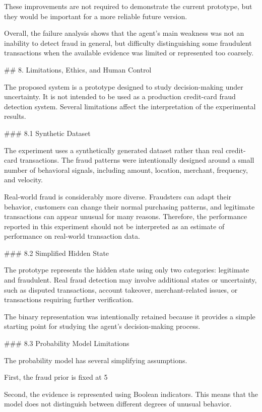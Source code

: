 These improvements are not required to demonstrate the current prototype, but they would be important for a more reliable future version.

Overall, the failure analysis shows that the agent's main weakness was not an inability to detect fraud in general, but difficulty distinguishing some fraudulent transactions when the available evidence was limited or represented too coarsely.

## 8. Limitations, Ethics, and Human Control

The proposed system is a prototype designed to study decision-making under uncertainty. It is not intended to be used as a production credit-card fraud detection system. Several limitations affect the interpretation of the experimental results.

### 8.1 Synthetic Dataset

The experiment uses a synthetically generated dataset rather than real credit-card transactions. The fraud patterns were intentionally designed around a small number of behavioral signals, including amount, location, merchant, frequency, and velocity.

Real-world fraud is considerably more diverse. Fraudsters can adapt their behavior, customers can change their normal purchasing patterns, and legitimate transactions can appear unusual for many reasons. Therefore, the performance reported in this experiment should not be interpreted as an estimate of performance on real-world transaction data.

### 8.2 Simplified Hidden State

The prototype represents the hidden state using only two categories: legitimate and fraudulent. Real fraud detection may involve additional states or uncertainty, such as disputed transactions, account takeover, merchant-related issues, or transactions requiring further verification.

The binary representation was intentionally retained because it provides a simple starting point for studying the agent's decision-making process.

### 8.3 Probability Model Limitations

The probability model has several simplifying assumptions.

First, the fraud prior is fixed at 5%

Second, the evidence is represented using Boolean indicators. This means that the model does not distinguish between different degrees of unusual behavior.

